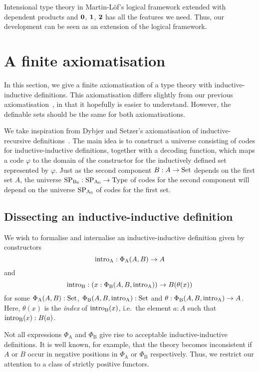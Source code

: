 \documentclass{article}
\begin{document}
Intensional type theory in Martin-L\"of's logical framework extended with
dependent products and $\mathbf{0}$, $\mathbf{1}$, $\mathbf{2}$
 has all the features we
need. Thus, our development can be seen as an extension of
the logical framework.

\section{A finite axiomatisation}
\label{sec:axiomatisation}
 

In this section, we give a finite axiomatisation of a type theory with
inductive-inductive definitions. This axiomatisation differs slightly
from our previous
axiomatisation~\cite{nordvallforsbergSetzer2010indind}, in that it
hopefully is easier to understand. However, the definable sets should
be the same for both axiomatisations.


We take inspiration from Dybjer and Setzer's axiomatisation of
inductive-recursive definitions~\cite{dybjersetzer1999finax}. The main
idea is to construct a universe consisting of codes for
inductive-inductive definitions, together with a decoding function,
which maps a code $\varphi$ to the domain of the constructor for the
inductively defined set represented by $\varphi$.  Just as the second
component $B : A \to \text{Set}$ depends on the first set $A$, the universe $\text{SP}_{\mathrm{B}_0} : \text{SP}_{\mathrm{A}_0} \to \text{Type}$
of codes for the second component will depend on the universe $\text{SP}_{\mathrm{A}_0}$ of codes
for the first set.

\subsection{Dissecting an inductive-inductive definition}
\label{sec:dissect-ind}

We wish to formalise and internalise an inductive-inductive definition
given by constructors
\[
\text{intro}_{\mathrm{A}} : \Phi_{\mathrm{A}}(A, B) \to A
\]
and
\[
\text{intro}_{\mathrm{B}} : (x : \Phi_{\mathrm{B}}(A, B, \text{intro}_{\mathrm{A}})) \to B(\theta(x))
\]
for some $\Phi_{\mathrm{A}}(A, B) : \text{Set}$, $\Phi_{\mathrm{B}}(A, B,
\text{intro}_{\mathrm{A}}) : \text{Set}$ and $\theta : \Phi_{\mathrm{B}}(A, B, \text{intro}_{\mathrm{A}}) \to
A$.
Here, $\theta(x)$ is the \emph{index} of $\text{intro}_{\mathrm{B}}(x)$, i.e.\ the element $a :
A$ such that $\text{intro}_{\mathrm{B}}(x) : B(a)$.

Not all expressions $\Phi_{\mathrm{A}}$ and $\Phi_{\mathrm{B}}$ give
rise to acceptable inductive-inductive definitions. It is well known,
for example, that the theory becomes inconsistent if $A$ or $B$ occur
in negative positions in $\Phi_{\mathrm{A}}$ or $\Phi_{\mathrm{B}}$
respectively. Thus, we restrict our attention to a class of strictly
positive functors.
\end{document}
